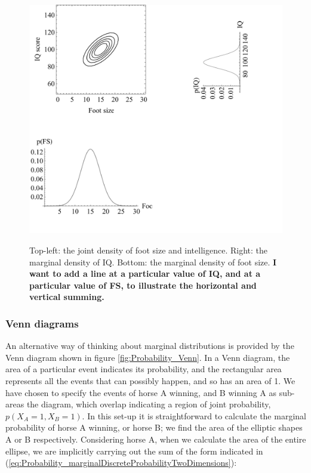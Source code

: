 \documentclass[11pt,fullpage]{book}
\begin{document}
\begin{figure}
\centering
\scalebox{0.5} 
{\includegraphics{Probability_footSizeIntelligenceMarginal.pdf}}
\caption{Top-left: the joint density of foot size and intelligence. Right: the marginal density of IQ. Bottom: the marginal density of foot size. \textbf{I want to add a line at a particular value of IQ, and at a particular value of FS, to illustrate the horizontal and vertical summing.}}\label{fig:Probability_footSizeIntelligenceMarginal}
\end{figure}

\subsubsection{Venn diagrams}
An alternative way of thinking about marginal distributions is provided by the Venn diagram shown in figure \ref{fig:Probability_Venn}. In a Venn diagram, the area of a particular event indicates its probability, and the rectangular area represents all the events that can possibly happen, and so has an area of 1. We have chosen to specify the events of horse A winning, and B winning A as sub-areas the diagram, which overlap indicating a region of joint probability, $p(X_A=1,X_B=1)$. In this set-up it is straightforward to calculate the marginal probability of horse A winning, or horse B; we find the area of the elliptic shapes A or B respectively. Considering horse A, when we calculate the area of the entire ellipse, we are implicitly carrying out the sum of the form indicated in (\ref{eq:Probability_marginalDiscreteProbabilityTwoDimensions}):
\end{document}
